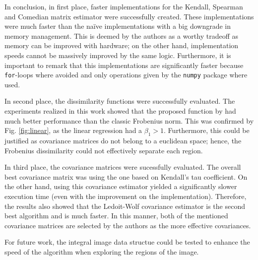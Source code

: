 \documentclass[11pt]{article}
\theoremstyle{definition}
\theoremstyle{remark}
\theoremstyle{remark}
\theoremstyle{remark}
\begin{document}
In conclusion, in first place, faster implementations for the Kendall, Spearman and Comedian matrix estimator were successfully created. These implementations were much faster than the naïve implementations with a big downgrade in memory management. This is deemed by the authors as a worthy tradeoff as memory can be improved with hardware; on the other hand, implementation speeds cannot be massively improved by the same logic. Furthermore, it is important to remark that this implementations are significantly faster because \texttt{for}-loops where avoided and only operations given by the \texttt{numpy} package where used.

In second place, the dissimilarity functions were successfully evaluated. The experiments realized in this work showed that the proposed function by \textcite{tuzel2006} had much better performance than the classic Frobenius norm. This was confirmed by Fig. \ref{fig:linear}, as the linear regression had a $\beta_1 > 1$. Furthermore, this could be justified as covariance matrices do not belong to a euclidean space; hence, the Frobenius dissimilarity could not effectively separate each region.

In third place, the covariance matrices were sucessfully evaluated. The overall best covariance matrix was using the one based on Kendall's tau coefficient. On the other hand, using this covariance estimator yielded a significantly slower execution time (even with the improvement on the implementation). Therefore, the results also showed that the Ledoit-Wolf covariance estimator is the second best algorithm and is much faster. In this manner, both of the mentioned covariance matrices are selected by the authors as the more effective covariances.

For future work, the integral image data structue \parencite{porikli2005integral} could be tested to enhance the speed of the algorithm when exploring the regions of the image.

\printbibliography
\end{document}
